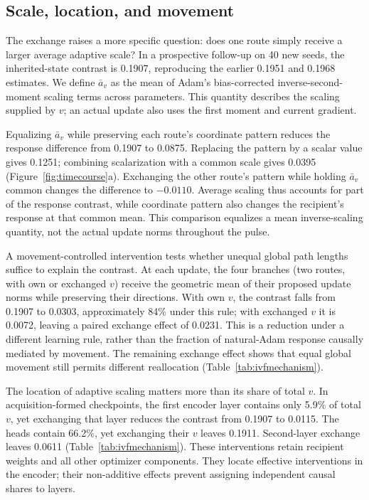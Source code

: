 \subsection{Scale, location, and movement}
The exchange raises a more specific question: does one route simply receive a larger average adaptive scale? In a prospective follow-up on 40 new seeds, the inherited-state contrast is 0.1907, reproducing the earlier 0.1951 and 0.1968 estimates. We define $\bar a_v$ as the mean of Adam's bias-corrected inverse-second-moment scaling terms across parameters. This quantity describes the scaling supplied by $v$; an actual update also uses the first moment and current gradient.

Equalizing $\bar a_v$ while preserving each route's coordinate pattern reduces the response difference from 0.1907 to 0.0875. Replacing the pattern by a scalar value gives 0.1251; combining scalarization with a common scale gives 0.0395 (Figure~\ref{fig:timecourse}a). Exchanging the other route's pattern while holding $\bar a_v$ common changes the difference to $-0.0110$. Average scaling thus accounts for part of the response contrast, while coordinate pattern also changes the recipient's response at that common mean. This comparison equalizes a mean inverse-scaling quantity, not the actual update norms throughout the pulse.

A movement-controlled intervention tests whether unequal global path lengths suffice to explain the contrast. At each update, the four branches (two routes, with own or exchanged $v$) receive the geometric mean of their proposed update norms while preserving their directions. With own $v$, the contrast falls from 0.1907 to 0.0303, approximately 84\% under this rule; with exchanged $v$ it is 0.0072, leaving a paired exchange effect of 0.0231. This is a reduction under a different learning rule, rather than the fraction of natural-Adam response causally mediated by movement. The remaining exchange effect shows that equal global movement still permits different reallocation (Table~\ref{tab:ivfmechanism}).

The location of adaptive scaling matters more than its share of total $v$. In acquisition-formed checkpoints, the first encoder layer contains only 5.9\% of total $v$, yet exchanging that layer reduces the contrast from 0.1907 to 0.0115. The heads contain 66.2\%, yet exchanging their $v$ leaves 0.1911. Second-layer exchange leaves 0.0611 (Table~\ref{tab:ivfmechanism}). These interventions retain recipient weights and all other optimizer components. They locate effective interventions in the encoder; their non-additive effects prevent assigning independent causal shares to layers.

